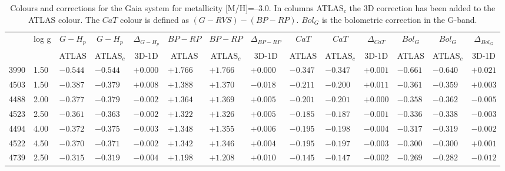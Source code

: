 \documentclass[]{aa}
\def\teff{$T\rm_{eff}$}
\begin{document}
\begin{appendix}
\begin{table*}
\caption{\label{Gaiam30}
Colours and corrections for the Gaia system for metallicity [M/H]=--3.0. In columns ATLAS$_c$ the 3D correction
has been added to the ATLAS colour. The $CaT$ colour is defined as $(G-RVS)-(BP-RP)$. $Bol_G$ is the bolometric
correction in the G-band. }
\renewcommand{\tabcolsep}{3pt}
\tabskip=0pt
\begin{center}
\begin{tabular}{llllllllllllll}
\hline\noalign{\smallskip}
\multicolumn{1}{c}{\teff} & 
\multicolumn{1}{c}{log g} & 
\multicolumn{1}{c}{$G-H_p$} &
\multicolumn{1}{c}{$G-H_p$} &
\multicolumn{1}{c}{$\Delta_{G-H_p}$} &
\multicolumn{1}{c}{$BP-RP$} &
\multicolumn{1}{c}{$BP-RP$} &
\multicolumn{1}{c}{$\Delta_{BP-RP}$} &
\multicolumn{1}{c}{$CaT$} &
\multicolumn{1}{c}{$CaT$} &
\multicolumn{1}{c}{$\Delta_{CaT}$} & 
\multicolumn{1}{c}{$Bol_G$} &
\multicolumn{1}{c}{$Bol_G$} &
\multicolumn{1}{c}{$\Delta_{Bol_G}$} \\
\multicolumn{2}{c}{ } &  
\multicolumn{1}{c}{ATLAS} &
\multicolumn{1}{c}{ATLAS$_c$}&
\multicolumn{1}{c}{3D-1D}&
\multicolumn{1}{c}{ATLAS} &
\multicolumn{1}{c}{ATLAS$_c$}&
\multicolumn{1}{c}{3D-1D}&
\multicolumn{1}{c}{ATLAS} &
\multicolumn{1}{c}{ATLAS$_c$}&
\multicolumn{1}{c}{3D-1D}&
\multicolumn{1}{c}{ATLAS} &
\multicolumn{1}{c}{ATLAS$_c$}&
\multicolumn{1}{c}{3D-1D} \\
\hline\noalign{\smallskip}
\hline\noalign{\smallskip}
3990  &1.50 & $-0.544$ &$ -0.544$ &$ +0.000$ &$ +1.766$ &$ +1.766$ &$ +0.000$ &$ -0.347$ &$ -0.347$ &$ +0.001$ &$ -0.661$& $-0.640$& $+0.021 $\\
4503  &1.50 & $-0.387$ &$ -0.379$ &$ +0.008$ &$ +1.388$ &$ +1.370$ &$ -0.018$ &$ -0.211$ &$ -0.200$ &$ +0.011$ &$ -0.361$& $-0.359$& $+0.003 $\\
4488  &2.00 & $-0.377$ &$ -0.379$ &$ -0.002$ &$ +1.364$ &$ +1.369$ &$ +0.005$ &$ -0.201$ &$ -0.201$ &$ +0.000$ &$ -0.358$& $-0.362$& $-0.005 $\\
4523  &2.50 & $-0.361$ &$ -0.363$ &$ -0.002$ &$ +1.322$ &$ +1.326$ &$ +0.005$ &$ -0.185$ &$ -0.187$ &$ -0.001$ &$ -0.336$& $-0.338$& $-0.003 $\\
4494  &4.00 & $-0.372$ &$ -0.375$ &$ -0.003$ &$ +1.348$ &$ +1.355$ &$ +0.006$ &$ -0.195$ &$ -0.198$ &$ -0.004$ &$ -0.317$& $-0.319$& $-0.002 $\\
4522  &4.50 & $-0.370$ &$ -0.371$ &$ -0.002$ &$ +1.342$ &$ +1.346$ &$ +0.004$ &$ -0.195$ &$ -0.197$ &$ -0.003$ &$ -0.300$& $-0.300$& $+0.001 $\\
4739  &2.50 & $-0.315$ &$ -0.319$ &$ -0.004$ &$ +1.198$ &$ +1.208$ &$ +0.010$ &$ -0.145$ &$ -0.147$ &$ -0.002$ &$ -0.269$& $-0.282$& $-0.012 $\\

\end{tabular}
\end{center}
\end{table*}
\end{appendix}
\end{document}
